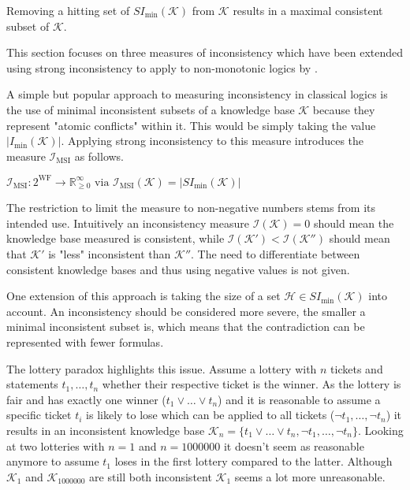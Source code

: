 \begin{theorem}
    Removing a hitting set of \(SI_{\min}(\mathcal{K})\) from \(\mathcal{K}\) results in a maximal consistent subset of \(\mathcal{K}\).
\end{theorem}

This section focuses on three measures of inconsistency which have been extended using strong inconsistency to apply to non-monotonic logics by \cite{ulbricht_handling_2020}.

A simple but popular approach to measuring inconsistency in classical logics is the use of minimal inconsistent subsets of a knowledge base \(\mathcal{K}\) because they represent "atomic conflicts" within it. This would be simply taking the value \(\left| I_{\min}(\mathcal{K}) \right|\). Applying strong inconsistency to this measure introduces the measure \(\mathcal{I}_{\text{MSI}}\) as follows.

\begin{definition}
    \(\mathcal{I}_{\text{MSI}}: 2^{\text{WF}} \rightarrow \mathbb{R}_{\geq 0}^{\infty} \text{ via } \mathcal{I}_{\text{MSI}}(\mathcal{K}) = \left| SI_{\min}(\mathcal{K}) \right|\)
\end{definition}

The restriction to limit the measure to non-negative numbers stems from its intended use. Intuitively an inconsistency measure \(\mathcal{I}(\mathcal{K}) = 0\) should mean the knowledge base measured is consistent, while \(\mathcal{I}(\mathcal{K}') < \mathcal{I}(\mathcal{K}'')\) should mean that \(\mathcal{K}'\) is "less" inconsistent than \(\mathcal{K}''\). The need to differentiate between consistent knowledge bases and thus using negative values is not given.

One extension of this approach is taking the size of a set \(\mathcal{H} \in SI_{\min}(\mathcal{K})\) into account. An inconsistency should be considered more severe, the smaller a minimal inconsistent subset is, which means that the contradiction can be represented with fewer formulas.

The lottery paradox \cite{kyburg_probability_1961} highlights this issue.
Assume a lottery with \(n\) tickets and statements \(t_1, \dots, t_n\) whether their respective ticket is the winner. As the lottery is fair and has exactly one winner (\(t_1 \lor \dots \lor t_n\)) and it is reasonable to assume a specific ticket \(t_i\) is likely to lose which can be applied to all tickets (\(\neg t_1, \dots, \neg t_n\)) it results in an inconsistent knowledge base \(\mathcal{K}_n = \{ t_1 \lor \dots \lor t_n, \neg t_1, \dots, \neg t_n \}\). Looking at two lotteries with \(n = 1\) and \(n = 1000000\) it doesn't seem as reasonable anymore to assume \(t_1\) loses in the first lottery compared to the latter. Although \(\mathcal{K}_1\) and \(\mathcal{K}_{1000000}\) are still both inconsistent \(\mathcal{K}_1\) seems a lot more unreasonable.

